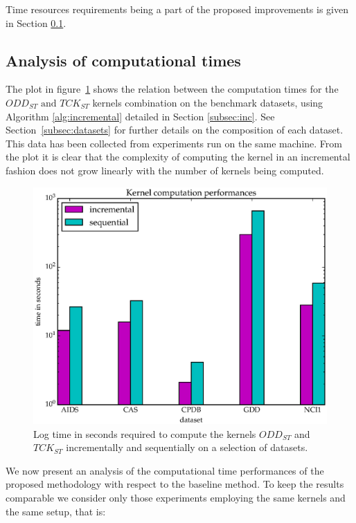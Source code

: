 Time resources requirements being a part of the proposed improvements is given
in Section \ref{subsec:time_results}.

\subsection{Analysis of computational times}
\label{subsec:time_results}

The plot in figure~\ref{fig:times} shows the relation between the computation times
for the $ODD_{ST}\text{ and }TCK_{ST}$ kernels combination on the benchmark datasets,
using Algorithm \ref{alg:incremental} detailed in Section \ref{subsec:inc}.
See Section~\ref{subsec:datasets} for further details on the composition of each dataset.
This data has been collected from experiments run on the same machine.
From the plot it is clear that the complexity of computing the kernel in an incremental
fashion does not grow linearly with the number of kernels being computed.

\begin{figure}[ht]
    \centering
    \includegraphics[scale=0.5]{Figures/kernel_times_log}
    \caption{Log time in seconds required to compute the kernels $ODD_{ST}$ and 
    $TCK_{ST}$ incrementally and sequentially on a selection of datasets.}
    \label{fig:times}
\end{figure}

We now present an analysis of the computational time performances of the proposed methodology
with respect to the baseline method. To keep the results comparable we consider only those
experiments employing the same kernels and the same setup, that is:

